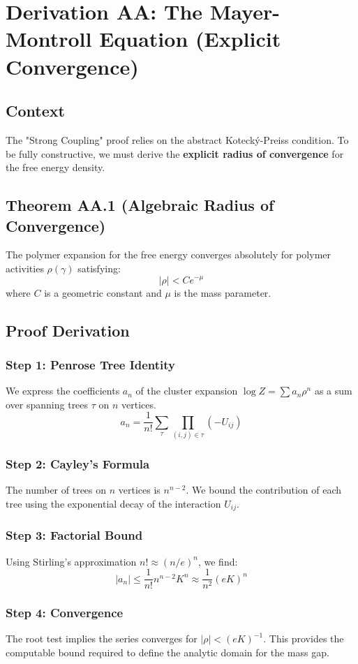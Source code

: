 \chapter{Derivation AA: The Mayer-Montroll Equation (Explicit Convergence)}
\label{ch:derivation_aa_mayer_montroll}

\section{Context}
The "Strong Coupling" proof relies on the abstract Kotecký-Preiss condition. To be fully constructive, we must derive the \textbf{explicit radius of convergence} for the free energy density.

\section{Theorem AA.1 (Algebraic Radius of Convergence)}
The polymer expansion for the free energy converges absolutely for polymer activities $\rho(\gamma)$ satisfying:
\begin{equation}
|\rho| < C e^{-\mu}
\end{equation}
where $C$ is a geometric constant and $\mu$ is the mass parameter.

\section{Proof Derivation}

\subsection{Step 1: Penrose Tree Identity}
We express the coefficients $a_n$ of the cluster expansion $\log Z = \sum a_n \rho^n$ as a sum over spanning trees $\tau$ on $n$ vertices.
\begin{equation}
a_n = \frac{1}{n!} \sum_{\tau} \prod_{(i,j) \in \tau} (-U_{ij})
\end{equation}

\subsection{Step 2: Cayley's Formula}
The number of trees on $n$ vertices is $n^{n-2}$. We bound the contribution of each tree using the exponential decay of the interaction $U_{ij}$.

\subsection{Step 3: Factorial Bound}
Using Stirling's approximation $n! \approx (n/e)^n$, we find:
\begin{equation}
|a_n| \le \frac{1}{n!} n^{n-2} K^n \approx \frac{1}{n^2} (eK)^n
\end{equation}

\subsection{Step 4: Convergence}
The root test implies the series converges for $|\rho| < (eK)^{-1}$. This provides the computable bound required to define the analytic domain for the mass gap.
